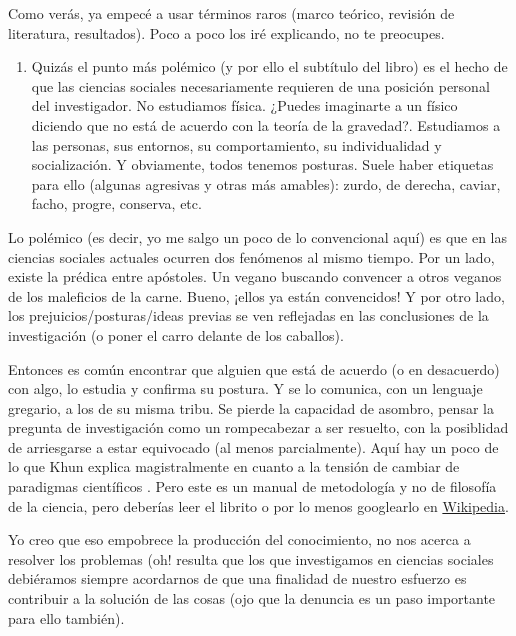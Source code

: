 \documentclass[
]{book}
\providecommand{\tightlist}{%
  \setlength{\itemsep}{0pt}\setlength{\parskip}{0pt}}
\begin{document}
Como verás, ya empecé a usar términos raros (marco teórico, revisión de literatura, resultados). Poco a poco los iré explicando, no te preocupes.

\begin{enumerate}
\def\labelenumi{\arabic{enumi})}
\setcounter{enumi}{2}
\tightlist
\item
  Quizás el punto más polémico (y por ello el subtítulo del libro) es el hecho de que las ciencias sociales necesariamente requieren de una posición personal del investigador. No estudiamos física. ¿Puedes imaginarte a un físico diciendo que no está de acuerdo con la teoría de la gravedad?. Estudiamos a las personas, sus entornos, su comportamiento, su individualidad y socialización. Y obviamente, todos tenemos posturas. Suele haber etiquetas para ello (algunas agresivas y otras más amables): zurdo, de derecha, caviar, facho, progre, conserva, etc.
\end{enumerate}

Lo polémico (es decir, yo me salgo un poco de lo convencional aquí) es que en las ciencias sociales actuales ocurren dos fenómenos al mismo tiempo. Por un lado, existe la prédica entre apóstoles. Un vegano buscando convencer a otros veganos de los maleficios de la carne. Bueno, ¡ellos ya están convencidos! Y por otro lado, los prejuicios/posturas/ideas previas se ven reflejadas en las conclusiones de la investigación (o poner el carro delante de los caballos).

Entonces es común encontrar que alguien que está de acuerdo (o en desacuerdo) con algo, lo estudia y confirma su postura. Y se lo comunica, con un lenguaje gregario, a los de su misma tribu. Se pierde la capacidad de asombro, pensar la pregunta de investigación como un rompecabezar a ser resuelto, con la posiblidad de arriesgarse a estar equivocado (al menos parcialmente). Aquí hay un poco de lo que Khun explica magistralmente en cuanto a la tensión de cambiar de paradigmas científicos \citep{kuhn1996}. Pero este es un manual de metodología y no de filosofía de la ciencia, pero deberías leer el librito o por lo menos googlearlo en \href{https://es.wikipedia.org/wiki/La_estructura_de_las_revoluciones_cient\%C3\%ADficas}{Wikipedia}.

Yo creo que eso empobrece la producción del conocimiento, no nos acerca a resolver los problemas (oh! resulta que los que investigamos en ciencias sociales debiéramos siempre acordarnos de que una finalidad de nuestro esfuerzo es contribuir a la solución de las cosas (ojo que la denuncia es un paso importante para ello también).
\end{document}
